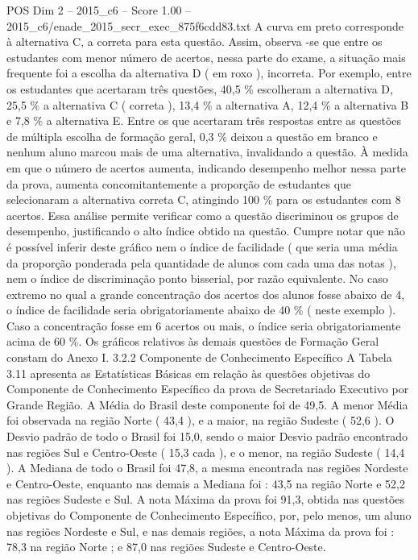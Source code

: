 \begin{textsample}{POS Dim 2 – 2015\_c6 – Score 1.00 – 2015\_c6/enade\_2015\_secr\_exec\_875f6cdd83.txt}
A curva em preto corresponde à alternativa C, a correta para esta questão.
Assim, observa -se que entre os estudantes com menor número de acertos, nessa parte do exame, a situação mais frequente foi a escolha da alternativa D ( em roxo ), incorreta.
Por exemplo, entre os estudantes que acertaram três questões, 40,5 \% escolheram a alternativa D, 25,5 \% a alternativa C ( correta ), 13,4 \% a alternativa A, 12,4 \% a alternativa B e 7,8 \% a alternativa E.
Entre os que acertaram três respostas entre as questões de múltipla escolha de formação geral, 0,3 \% deixou a questão em branco e nenhum aluno marcou mais de uma alternativa, invalidando a questão.
À medida em que o número de acertos aumenta, indicando desempenho melhor nessa parte da prova, aumenta concomitantemente a proporção de estudantes que selecionaram a alternativa correta C, atingindo 100 \% para os estudantes com 8 acertos.
Essa análise permite verificar como a questão discriminou os grupos de desempenho, justificando o alto índice obtido na questão.
Cumpre notar que não é possível inferir deste gráfico nem o índice de facilidade ( que seria uma média da proporção ponderada pela quantidade de alunos com cada uma das notas ), nem o índice de discriminação ponto bisserial, por razão equivalente.
No caso extremo no qual a grande concentração dos acertos dos alunos fosse abaixo de 4, o índice de facilidade seria obrigatoriamente abaixo de 40 \% ( neste exemplo ).
Caso a concentração fosse em 6 acertos ou mais, o índice seria obrigatoriamente acima de 60 \%.
Os gráficos relativos às demais questões de Formação Geral constam do Anexo I. 3.2.2 Componente de Conhecimento Específico A Tabela 3.11 apresenta as Estatísticas Básicas em relação às questões objetivas do Componente de Conhecimento Específico da prova de Secretariado Executivo por Grande Região.
A Média do Brasil deste componente foi de 49,5.
A menor Média foi observada na região Norte ( 43,4 ), e a maior, na região Sudeste ( 52,6 ).
O Desvio padrão de todo o Brasil foi 15,0, sendo o maior Desvio padrão encontrado nas regiões Sul e Centro-Oeste ( 15,3 cada ), e o menor, na região Sudeste ( 14,4 ).
A Mediana de todo o Brasil foi 47,8, a mesma encontrada nas regiões Nordeste e Centro-Oeste, enquanto nas demais a Mediana foi : 43,5 na região Norte e 52,2 nas regiões Sudeste e Sul.
A nota Máxima da prova foi 91,3, obtida nas questões objetivas do Componente de Conhecimento Específico, por, pelo menos, um aluno nas regiões Nordeste e Sul, e nas demais regiões, a nota Máxima da prova foi : 78,3 na região Norte ; e 87,0 nas regiões Sudeste e Centro-Oeste.

\end{textsample}
